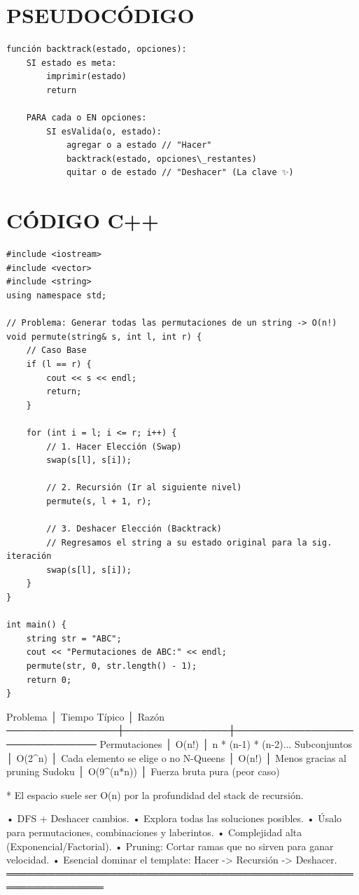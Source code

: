 \section*{PSEUDOCÓDIGO}
\hrulefill
\begin{verbatim}
función backtrack(estado, opciones):
    SI estado es meta:
        imprimir(estado)
        return

    PARA cada o EN opciones:
        SI esValida(o, estado):
            agregar o a estado // "Hacer"
            backtrack(estado, opciones\_restantes)
            quitar o de estado // "Deshacer" (La clave ✨)
\end{verbatim}
\section*{CÓDIGO C++}
\hrulefill
\begin{lstlisting}
#include <iostream>
#include <vector>
#include <string>
using namespace std;

// Problema: Generar todas las permutaciones de un string -> O(n!)
void permute(string& s, int l, int r) {
    // Caso Base
    if (l == r) {
        cout << s << endl;
        return;
    }

    for (int i = l; i <= r; i++) {
        // 1. Hacer Elección (Swap)
        swap(s[l], s[i]);

        // 2. Recursión (Ir al siguiente nivel)
        permute(s, l + 1, r);

        // 3. Deshacer Elección (Backtrack)
        // Regresamos el string a su estado original para la sig. iteración
        swap(s[l], s[i]);
    }
}

int main() {
    string str = "ABC";
    cout << "Permutaciones de ABC:" << endl;
    permute(str, 0, str.length() - 1);
    return 0;
}
\end{lstlisting}
\begin{dsacomplejidad}
Problema        │ Tiempo Típico │ Razón
  ────────────────┼───────────────┼──────────────────────────────
  Permutaciones   │ O(n!)         │ n * (n-1) * (n-2)...
  Subconjuntos    │ O(2\textasciicircum{}n)        │ Cada elemento se elige o no
  N-Queens        │ O(n!)         │ Menos gracias al pruning
  Sudoku          │ O(9\textasciicircum{}(n*n))    │ Fuerza bruta pura (peor caso)

* El espacio suele ser O(n) por la profundidad del stack de recursión.
\end{dsacomplejidad}
\begin{dsaentrevistas}

\end{dsaentrevistas}
\begin{dsaresumen}
• DFS + Deshacer cambios.
• Explora todas las soluciones posibles.
• Úsalo para permutaciones, combinaciones y laberintos.
• Complejidad alta (Exponencial/Factorial).
• Pruning: Cortar ramas que no sirven para ganar velocidad.
• Esencial dominar el template: Hacer -> Recursión -> Deshacer.
════════════════════════════════════════════════════════════════
\end{dsaresumen}

